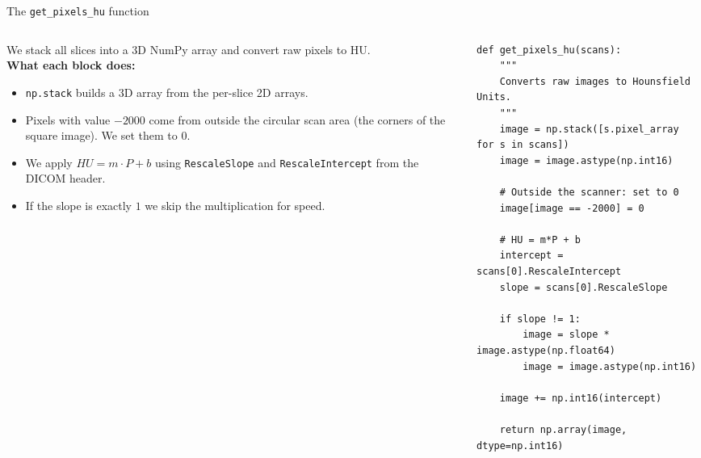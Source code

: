 \documentclass[10pt,aspectratio=169]{beamer}
\renewcommand{\section}[2][]{}
\begin{document}
\begin{frame}[fragile]{The \texttt{get\_pixels\_hu} function}
\begin{columns}[T,onlytextwidth]
\begin{column}{0.42\textwidth}
\small
We stack all slices into a 3D NumPy array and convert raw pixels to HU.\\[0.4em]
\textbf{What each block does:}
\begin{itemize}
  \item \texttt{np.stack} builds a 3D array from the per-slice 2D arrays.
  \item Pixels with value $-2000$ come from outside the circular scan area (the corners of the square image). We set them to $0$.
  \item We apply $HU = m\cdot P + b$ using \texttt{RescaleSlope} and \texttt{RescaleIntercept} from the DICOM header.
  \item If the slope is exactly $1$ we skip the multiplication for speed.
\end{itemize}
\end{column}
\begin{column}{0.56\textwidth}
\begin{lstlisting}[firstnumber=42]
def get_pixels_hu(scans):
    """
    Converts raw images to Hounsfield Units.
    """
    image = np.stack([s.pixel_array for s in scans])
    image = image.astype(np.int16)

    # Outside the scanner: set to 0
    image[image == -2000] = 0

    # HU = m*P + b
    intercept = scans[0].RescaleIntercept
    slope = scans[0].RescaleSlope

    if slope != 1:
        image = slope * image.astype(np.float64)
        image = image.astype(np.int16)

    image += np.int16(intercept)

    return np.array(image, dtype=np.int16)
\end{lstlisting}
\end{column}
\end{columns}
\end{frame}

\section{Picking a sample slice}
\end{document}

